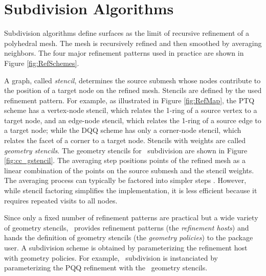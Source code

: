  



\section{Subdivision Algorithms}
Subdivision algorithms define surfaces as the limit
of recursive refinement of a polyhedral mesh. 
The mesh is recursively refined and then smoothed 
by averaging neighbors. The four major refinement 
patterns used in practice are shown in Figure \ref{fig:RefSchemes}.

A graph, called \emph{stencil}, determines the source submesh 
whose nodes contribute to the position of a target node on the
refined mesh. Stencils are defined by the used refinement pattern.
For example, as illustrated in Figure \ref{fig:RefMap},
the PTQ scheme has a vertex-node stencil, which relates the 1-ring 
of a source vertex to a target node, and an edge-node stencil,
which relates the 1-ring of a source edge to a target node; 
while the DQQ scheme has only a corner-node stencil, which 
relates the facet of a corner to a target node.
Stencils with weights are called \emph{geometry stencils}.
The geometry stencils for \CC\ subdivision are
shown in Figure \ref{fig:cc_gstencil}. 
The averaging step positions points of the
refined mesh as a linear combination
of the points on the source submesh and the stencil weights.
The averaging process can typically be factored into 
simpler steps \cite{Oswald-2003-CSS}.
However, while stencil factoring simplifies the implementation,
it is less efficient because it requires repeated visits 
to all nodes.

Since only a fixed number of refinement patterns are practical
but a wide variety of geometry stencils,
\ provides refinement patterns (the \emph{refinement hosts})
and hands the definition of geometry stencils
(the \emph{geometry policies}) to the package user.
A subdivision scheme is obtained by parameterizing the refinement
host with geometry policies. 
For example, \CC\ subdivision is instanciated by parameterizing the 
PQQ refinement with the \CC\ geometry stencils.

